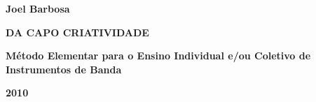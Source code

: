 \thispagestyle{empty}

\begin{center}

\textbf{\huge{Joel Barbosa}}
  \vspace*{55ex}

\textbf{\huge{DA CAPO CRIATIVIDADE}}
  \vspace*{5ex}

\textbf{\Large{Método Elementar para o Ensino Individual e/ou Coletivo
    de Instrumentos de Banda}}\\
  \vspace*{55ex}


\textbf{\Huge{2010}}


\end{center}